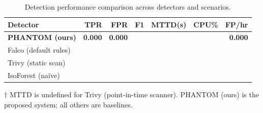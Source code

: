 \begin{table}[h]
\centering
\caption{Detection performance comparison across detectors and scenarios.}
\label{tab:detection_performance}
\begin{tabular}{lrrrrrr}
\hline
Detector & TPR & FPR & F1 & MTTD(s) & CPU\% & FP/hr \\
\hline
\textbf{PHANTOM (ours)} & \textbf{0.000} & \textbf{0.000} & \text{---} & \text{---} & \text{---} & \textbf{0.000} \\
Falco (default rules) & \text{---} & \text{---} & \text{---} & \text{---} & \text{---} & \text{---} \\
Trivy (static scan) & \text{---} & \text{---} & \text{---} & \text{---} & \text{---} & \text{---} \\
IsoForest (na\"{i}ve) & \text{---} & \text{---} & \text{---} & \text{---} & \text{---} & \text{---} \\
\hline
\end{tabular}
\vspace{0.5em}
\footnotesize{$\dagger$ MTTD is undefined for Trivy (point-in-time scanner). PHANTOM (ours) is the proposed system; all others are baselines.}
\end{table}